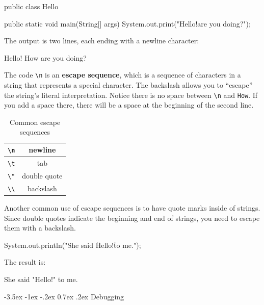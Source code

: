 \documentclass[12pt]{book}
\makeatletter
\theoremstyle{exercise}
\renewcommand{\section}{\@startsection {section}{1}{\z@}%
    {-3.5ex \@plus -1ex \@minus -.2ex}%
    {0.7ex \@plus.2ex}%
    {\normalfont\Large\bfseries}}
\makeatother
\begin{document}
\begin{code}
public class Hello {

    public static void main(String[] args) {
        System.out.print("Hello!\nHow are you doing?\n");
    }

}
\end{code}

The output is two lines, each ending with a newline character:

\begin{stdout}
Hello!
How are you doing?
\end{stdout}


The code \verb"\n" is an {\bf escape sequence}, which is a sequence of characters in a string that represents a special character.
The backslash allows you to ``escape'' the string's literal interpretation.
Notice there is no space between \verb"\n" and \verb"How".
If you add a space there, there will be a space at the beginning of the second line.

\begin{table}[!h]
\begin{center}
\begin{tabular}{|c|c|}
\hline
\verb"\n" & newline \\
\hline
\verb"\t" & tab \\
\hline
\verb'\"' & double quote \\
\hline
\verb"\\" & backslash \\
\hline
\end{tabular}
\caption{Common escape sequences}
\end{center}
\end{table}

Another common use of escape sequences is to have quote marks inside of strings.
Since double quotes indicate the beginning and end of strings, you need to escape them with a backslash.

\begin{code}
    System.out.println("She said \"Hello!\" to me.");
\end{code}

The result is:

\begin{stdout}
She said "Hello!" to me.
\end{stdout}


\section{Debugging}
\label{sec:examples}
\end{document}
